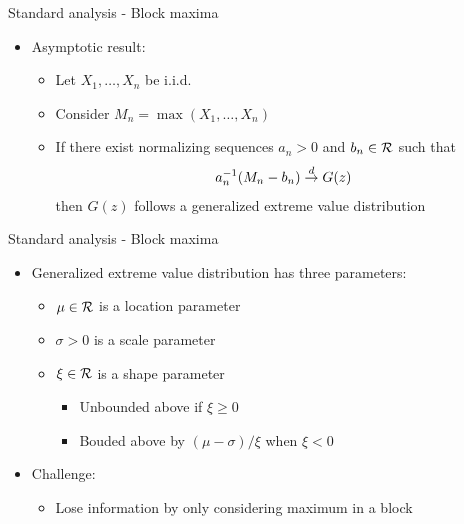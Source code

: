 \documentclass{beamer}
\begin{document}
\begin{frame}{Standard analysis - Block maxima}
  \begin{itemize} \setlength{\itemsep}{0.5em}
    \item Asymptotic result:
    \begin{itemize}
      \item Let $X_1, \ldots, X_n$ be i.i.d.
      \item Consider $M_n = \max(X_1, \ldots, X_n)$
      \item If there exist normalizing sequences $a_n > 0$ and $b_n \in {\cal R}$ such that
      \begin{align*}
        a_n^{-1} (M_n - b_n) \stackrel{d}{\rightarrow} G(z)
      \end{align*}
      then $G(z)$ follows a generalized extreme value distribution
    \end{itemize}
  \end{itemize}
\end{frame}


\begin{frame}{Standard analysis - Block maxima}
  \begin{itemize} \setlength{\itemsep}{0.5em}
    \item Generalized extreme value distribution has three parameters:
    \begin{itemize}
      \item $\mu \in {\cal R}$ is a location parameter
      \item $\sigma > 0$ is a scale parameter
      \item $\xi \in {\cal R}$ is a shape parameter
      \begin{itemize}
        \item Unbounded above if $\xi \ge 0$
        \item Bouded above by $(\mu - \sigma) / \xi$ when $\xi < 0$
      \end{itemize}
    \end{itemize}
    \item Challenge:
    \begin{itemize}
      \item Lose information by only considering maximum in a block
    \end{itemize}
  \end{itemize}
\end{frame}
\end{document}
